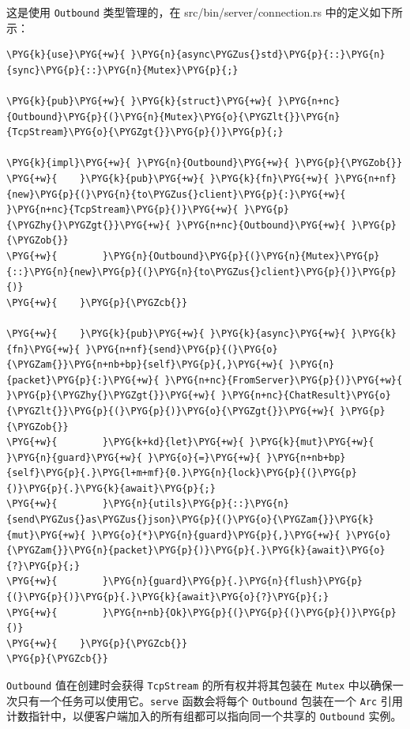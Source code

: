 这是使用 \texttt{Outbound} 类型管理的，在 src/bin/server/\allowbreak{}connection.rs 中的定义如下所示：

\begin{Verbatim}[commandchars=\\\{\},breaklines=true,breakanywhere=true,fontsize=\codefont,xleftmargin=17bp]
\PYG{k}{use}\PYG{+w}{ }\PYG{n}{async\PYGZus{}std}\PYG{p}{::}\PYG{n}{sync}\PYG{p}{::}\PYG{n}{Mutex}\PYG{p}{;}

\PYG{k}{pub}\PYG{+w}{ }\PYG{k}{struct}\PYG{+w}{ }\PYG{n+nc}{Outbound}\PYG{p}{(}\PYG{n}{Mutex}\PYG{o}{\PYGZlt{}}\PYG{n}{TcpStream}\PYG{o}{\PYGZgt{}}\PYG{p}{)}\PYG{p}{;}

\PYG{k}{impl}\PYG{+w}{ }\PYG{n}{Outbound}\PYG{+w}{ }\PYG{p}{\PYGZob{}}
\PYG{+w}{    }\PYG{k}{pub}\PYG{+w}{ }\PYG{k}{fn}\PYG{+w}{ }\PYG{n+nf}{new}\PYG{p}{(}\PYG{n}{to\PYGZus{}client}\PYG{p}{:}\PYG{+w}{ }\PYG{n+nc}{TcpStream}\PYG{p}{)}\PYG{+w}{ }\PYG{p}{\PYGZhy{}\PYGZgt{}}\PYG{+w}{ }\PYG{n+nc}{Outbound}\PYG{+w}{ }\PYG{p}{\PYGZob{}}
\PYG{+w}{        }\PYG{n}{Outbound}\PYG{p}{(}\PYG{n}{Mutex}\PYG{p}{::}\PYG{n}{new}\PYG{p}{(}\PYG{n}{to\PYGZus{}client}\PYG{p}{)}\PYG{p}{)}
\PYG{+w}{    }\PYG{p}{\PYGZcb{}}

\PYG{+w}{    }\PYG{k}{pub}\PYG{+w}{ }\PYG{k}{async}\PYG{+w}{ }\PYG{k}{fn}\PYG{+w}{ }\PYG{n+nf}{send}\PYG{p}{(}\PYG{o}{\PYGZam{}}\PYG{n+nb+bp}{self}\PYG{p}{,}\PYG{+w}{ }\PYG{n}{packet}\PYG{p}{:}\PYG{+w}{ }\PYG{n+nc}{FromServer}\PYG{p}{)}\PYG{+w}{ }\PYG{p}{\PYGZhy{}\PYGZgt{}}\PYG{+w}{ }\PYG{n+nc}{ChatResult}\PYG{o}{\PYGZlt{}}\PYG{p}{(}\PYG{p}{)}\PYG{o}{\PYGZgt{}}\PYG{+w}{ }\PYG{p}{\PYGZob{}}
\PYG{+w}{        }\PYG{k+kd}{let}\PYG{+w}{ }\PYG{k}{mut}\PYG{+w}{ }\PYG{n}{guard}\PYG{+w}{ }\PYG{o}{=}\PYG{+w}{ }\PYG{n+nb+bp}{self}\PYG{p}{.}\PYG{l+m+mf}{0.}\PYG{n}{lock}\PYG{p}{(}\PYG{p}{)}\PYG{p}{.}\PYG{k}{await}\PYG{p}{;}
\PYG{+w}{        }\PYG{n}{utils}\PYG{p}{::}\PYG{n}{send\PYGZus{}as\PYGZus{}json}\PYG{p}{(}\PYG{o}{\PYGZam{}}\PYG{k}{mut}\PYG{+w}{ }\PYG{o}{*}\PYG{n}{guard}\PYG{p}{,}\PYG{+w}{ }\PYG{o}{\PYGZam{}}\PYG{n}{packet}\PYG{p}{)}\PYG{p}{.}\PYG{k}{await}\PYG{o}{?}\PYG{p}{;}
\PYG{+w}{        }\PYG{n}{guard}\PYG{p}{.}\PYG{n}{flush}\PYG{p}{(}\PYG{p}{)}\PYG{p}{.}\PYG{k}{await}\PYG{o}{?}\PYG{p}{;}
\PYG{+w}{        }\PYG{n+nb}{Ok}\PYG{p}{(}\PYG{p}{(}\PYG{p}{)}\PYG{p}{)}
\PYG{+w}{    }\PYG{p}{\PYGZcb{}}
\PYG{p}{\PYGZcb{}}
\end{Verbatim}

\texttt{Outbound} 值在创建时会获得 \texttt{TcpStream} 的所有权并将其包装在 \texttt{Mutex} 中以确保一次只有一个任务可以使用它。\texttt{serve} 函数会将每个 \texttt{Outbound} 包装在一个 \texttt{Arc} 引用计数指针中，以便客户端加入的所有组都可以指向同一个共享的 \texttt{Outbound} 实例。

